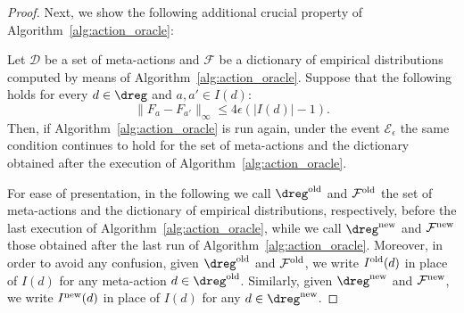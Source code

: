 \begin{proof}
	
	
	Next, we show the following additional crucial property of Algorithm~\ref{alg:action_oracle}:
	\begin{property}\label{prop_2}
	Let $\mathcal{D}$ be a set of meta-actions and $\mathcal{F}$ be a dictionary of empirical distributions computed by means of Algorithm~\ref{alg:action_oracle}.
	Suppose that the following holds for every $d \in \dreg$ and $a, a' \in I(d)$:
	\begin{equation}\label{eq:inductive}
		\|F_{a}-F_{a'}\|_{\infty} \le 4 \epsilon (|I(d)|-1).
	\end{equation}
	Then, if Algorithm~\ref{alg:action_oracle} is run again, under the event $\mathcal{E}_\epsilon$ the same condition continues to hold for the set of meta-actions and the dictionary obtained after the execution of Algorithm~\ref{alg:action_oracle}.
	\end{property}
	For ease of presentation, in the following we call $\dreg^{\textnormal{old}}$ and $\mathcal{F}^{\textnormal{old}}$ the set of meta-actions and the dictionary of empirical distributions, respectively, before the last execution of Algorithm~\ref{alg:action_oracle}, while we call $\dreg^{\textnormal{new}}$ and $\mathcal{F}^{\textnormal{new}}$ those obtained after the last run of Algorithm~\ref{alg:action_oracle}.
	Moreover, in order to avoid any confusion, given $\dreg^{\textnormal{old}}$ and $\mathcal{F}^{\textnormal{old}}$, we write $I^{\textnormal{old}}(d)$ in place of $I(d)$ for any meta-action $d \in \dreg^{\textnormal{old}}$.
	Similarly, given $\dreg^{\textnormal{new}}$ and $\mathcal{F}^{\textnormal{new}}$, we write $I^{\textnormal{new}}(d)$ in place of $I(d)$ for any $d \in \dreg^{\textnormal{new}}$.
	
	
	

\end{proof}
